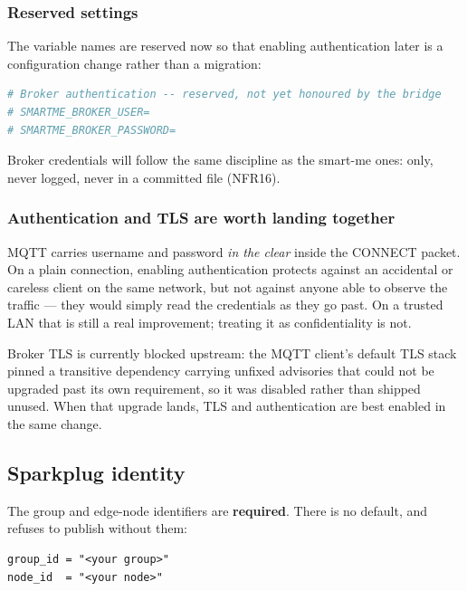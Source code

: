 \subsubsection*{Reserved settings}

The variable names are reserved now so that enabling authentication later is a
configuration change rather than a migration:

\begin{lstlisting}[language=bash]
# Broker authentication -- reserved, not yet honoured by the bridge
# SMARTME_BROKER_USER=
# SMARTME_BROKER_PASSWORD=
\end{lstlisting}

\begin{note}
Broker credentials will follow the same discipline as the smart-me ones:  only,
never logged, never in a committed file (NFR16).
\end{note}

\subsubsection*{Authentication and TLS are worth landing together}

MQTT carries username and password \emph{in the clear} inside the CONNECT packet. On a
plain connection, enabling authentication protects against an accidental or careless
client on the same network, but not against anyone able to observe the traffic --- they
would simply read the credentials as they go past. On a trusted LAN that is still a real
improvement; treating it as confidentiality is not.

Broker TLS is currently blocked upstream: the MQTT client's default TLS stack pinned a
transitive dependency carrying unfixed advisories that could not be upgraded past its own
requirement, so it was disabled rather than shipped unused. When that upgrade lands, TLS
and authentication are best enabled in the same change.

\subsection{Sparkplug identity}

The group and edge-node identifiers are \textbf{required}. There is no default, and
\prog refuses to publish without them:

\begin{lstlisting}
group_id = "<your group>"
node_id  = "<your node>"
\end{lstlisting}

